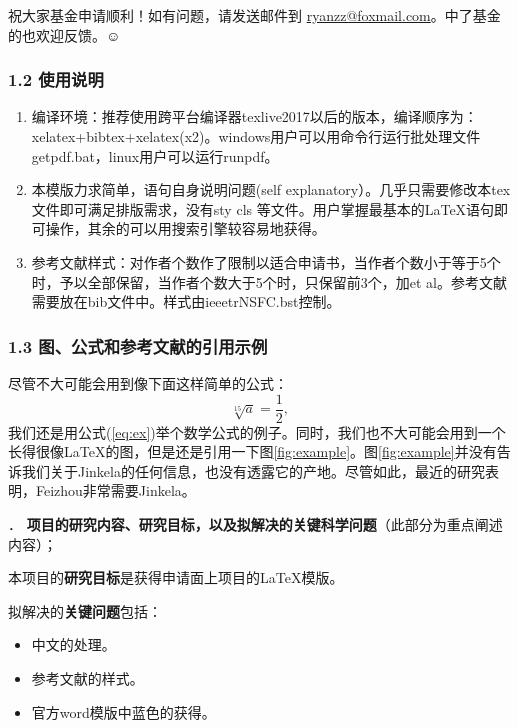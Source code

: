 \documentclass[12pt,UTF8,AutoFakeBold=2,a4paper]{ctexart} %
\newcommand{\sihao}{\fontsize{14pt}{\baselineskip}\selectfont}
\begin{document}
祝大家基金申请顺利！如有问题，请发送邮件到 \href{mailto:ryanzz@foxmail.com}{ryanzz@foxmail.com}。中了基金的也欢迎反馈。$\smiley$

\subsubsection{1.2 使用说明}\label{sss:instruction}

\begin{enumerate}
\item 编译环境：推荐使用跨平台编译器texlive2017以后的版本，编译顺序为：xelatex+bibtex+xelatex(x2)。windows用户可以用命令行运行批处理文件getpdf.bat，linux用户可以运行runpdf。
\item 本模版力求简单，语句自身说明问题(self explanatory）。几乎只需要修改本tex文件即可满足排版需求，没有sty cls 等文件。用户掌握最基本的\LaTeX 语句即可操作，其余的可以用搜索引擎较容易地获得。
\item 参考文献样式：对作者个数作了限制以适合申请书，当作者个数小于等于5个时，予以全部保留，当作者个数大于5个时，只保留前3个，加et al。参考文献需要放在bib文件中。样式由ieeetrNSFC.bst控制。
\end{enumerate}

\subsubsection{1.3 图、公式和参考文献的引用示例}
尽管不大可能会用到像下面这样简单的公式：
\begin{equation}
\label{eq:ex}
\sqrt[15]{a}=\frac{1}{2},
\end{equation}
我们还是用公式(\ref{eq:ex})举个数学公式的例子。同时，我们也不大可能会用到一个长得很像\LaTeX 的图，但是还是引用一下图\ref{fig:example}。图\ref{fig:example}并没有告诉我们关于Jinkela\cite{John1997,Smith1900}的任何信息，也没有透露它的产地\cite{Piter1992}。尽管如此，最近的研究表明，Feizhou非常需要Jinkela\cite{John1997}。




\newpage

{\sihao \color{MsBlue} ． {\bfseries 项目的研究内容、研究目标，以及拟解决的关键科学问题}（此部分为重点阐述内容）；}

本项目的{\bfseries 研究目标}是获得申请面上项目的\LaTeX 模版。

拟解决的{\bfseries 关键问题}包括：

\begin{itemize}
\item 中文的处理。
\item 参考文献\cite{John1997,Smith1900,Piter1992}的样式。
\item 官方word模版中蓝色的获得。
\end{itemize}
\end{document}
